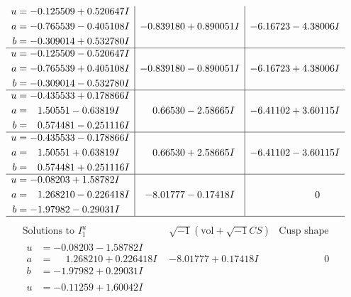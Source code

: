 \documentclass[1p]{elsarticle_modified}
\theoremstyle{definition}
\newcommand{\I}{\sqrt{-1}}
\begin{document}
$$\begin{array}{c|c|c}
\begin{aligned}
u &= -0.125509 + 0.520647 I \\
a &= -0.765539 - 0.405108 I \\
b &= -0.309014 + 0.532780 I\end{aligned}
 & -0.839180 + 0.890051 I & -6.16723 - 4.38006 I \\ \hline\begin{aligned}
u &= -0.125509 - 0.520647 I \\
a &= -0.765539 + 0.405108 I \\
b &= -0.309014 - 0.532780 I\end{aligned}
 & -0.839180 - 0.890051 I & -6.16723 + 4.38006 I \\ \hline\begin{aligned}
u &= -0.435533 + 0.178866 I \\
a &= \phantom{-}1.50551 - 0.63819 I \\
b &= \phantom{-}0.574481 - 0.251116 I\end{aligned}
 & \phantom{-}0.66530 - 2.58665 I & -6.41102 + 3.60115 I \\ \hline\begin{aligned}
u &= -0.435533 - 0.178866 I \\
a &= \phantom{-}1.50551 + 0.63819 I \\
b &= \phantom{-}0.574481 + 0.251116 I\end{aligned}
 & \phantom{-}0.66530 + 2.58665 I & -6.41102 - 3.60115 I \\ \hline\begin{aligned}
u &= -0.08203 + 1.58782 I \\
a &= \phantom{-}1.268210 - 0.226418 I \\
b &= -1.97982 - 0.29031 I\end{aligned}
 & -8.01777 - 0.17418 I & \phantom{-0.000000 } 0\\
 \hline 
 \end{array}$$\newpage$$\begin{array}{c|c|c}  
\text{Solutions to }I^u_{1}& \I (\text{vol} + \sqrt{-1}CS) & \text{Cusp shape}\\
 \hline 
\begin{aligned}
u &= -0.08203 - 1.58782 I \\
a &= \phantom{-}1.268210 + 0.226418 I \\
b &= -1.97982 + 0.29031 I\end{aligned}
 & -8.01777 + 0.17418 I & \phantom{-0.000000 } 0 \\ \hline\begin{aligned}
u &= -0.11259 + 1.60042 I \\

\end{aligned}
\end{array}$$
\end{document}
